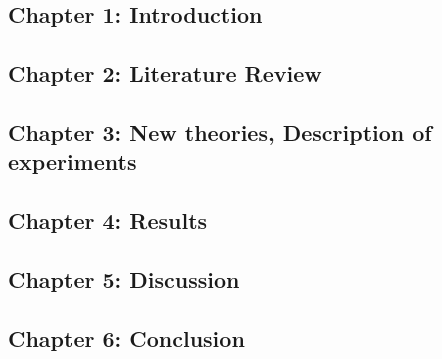 \documentclass{article}
\begin{document}
	\subsection{Chapter 1: Introduction}
	\subsection{Chapter 2: Literature Review}
	\subsection{Chapter 3: New theories, Description of experiments}
	\subsection{Chapter 4: Results}
	\subsection{Chapter 5: Discussion}
	\subsection{Chapter 6: Conclusion}
\end{document}
